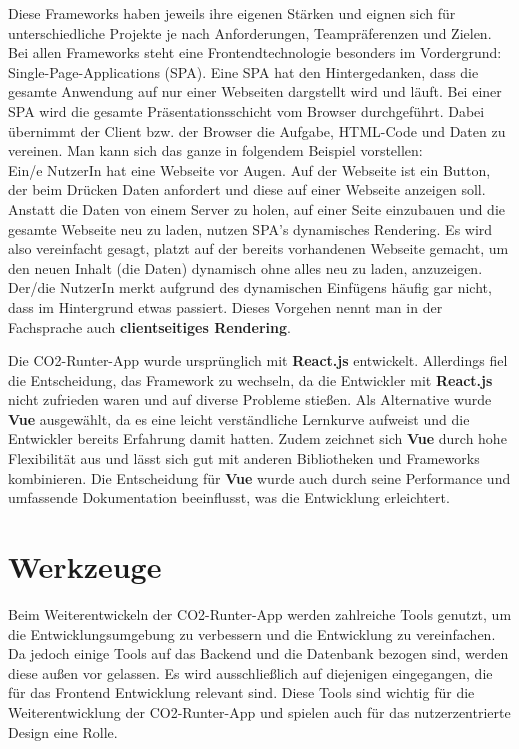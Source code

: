 Diese Frameworks haben jeweils ihre eigenen Stärken und eignen sich für unterschiedliche Projekte je nach Anforderungen, Teampräferenzen und Zielen.\cite{angular-vuejs-reactjs-comparison:3, angular-vuejs-reactjs-comparison:4}
Bei allen Frameworks steht eine Frontendtechnologie besonders im Vordergrund: Single-Page-Applications (\acs{SPA}).
Eine \acs{SPA} hat den Hintergedanken, dass die gesamte Anwendung auf nur einer Webseiten dargstellt wird und läuft. \cite*{spa}
Bei einer \acs{SPA} wird die gesamte Präsentationsschicht vom Browser durchgeführt.
Dabei übernimmt der Client bzw. der Browser die Aufgabe, \acs{HTML}-Code und Daten zu vereinen. \cite{spa}
Man kann sich das ganze in folgendem Beispiel vorstellen:\\
Ein/e NutzerIn hat eine Webseite vor Augen. Auf der Webseite ist ein Button, der beim Drücken Daten anfordert und diese auf einer Webseite anzeigen soll.
Anstatt die Daten von einem Server zu holen, auf einer Seite einzubauen und die gesamte Webseite neu zu laden, nutzen \acs{SPA}'s dynamisches Rendering.
Es wird also vereinfacht gesagt, platzt auf der bereits vorhandenen Webseite gemacht, um den neuen Inhalt (die Daten) dynamisch ohne alles neu zu laden, anzuzeigen.
Der/die NutzerIn merkt aufgrund des dynamischen Einfügens häufig gar nicht, dass im Hintergrund etwas passiert.
Dieses Vorgehen nennt man in der Fachsprache auch \textbf{clientseitiges Rendering}.

Die CO2-Runter-App wurde ursprünglich mit \textbf{React.js} entwickelt. Allerdings fiel die Entscheidung, das Framework zu wechseln, da die Entwickler mit \textbf{React.js} nicht zufrieden waren und auf diverse Probleme stießen. Als Alternative wurde \textbf{Vue} ausgewählt, da es eine leicht verständliche Lernkurve aufweist und die Entwickler bereits Erfahrung damit hatten. Zudem zeichnet sich \textbf{Vue} durch hohe Flexibilität aus und lässt sich gut mit anderen Bibliotheken und Frameworks kombinieren. Die Entscheidung für \textbf{Vue} wurde auch durch seine Performance und umfassende Dokumentation beeinflusst, was die Entwicklung erleichtert.

\section{Werkzeuge}
\label{chapter:3-werkzeuge}

Beim Weiterentwickeln der CO2-Runter-App werden zahlreiche Tools genutzt, um die Entwicklungsumgebung zu verbessern und die Entwicklung zu vereinfachen. Da jedoch einige Tools auf das Backend und die Datenbank bezogen sind, werden diese außen vor gelassen. Es wird ausschließlich auf diejenigen eingegangen, die für das Frontend Entwicklung relevant sind. Diese Tools sind wichtig für die Weiterentwicklung der CO2-Runter-App und spielen auch für das nutzerzentrierte Design eine Rolle.

